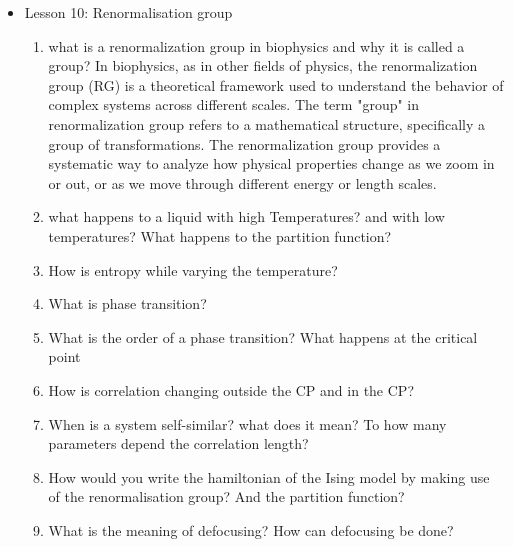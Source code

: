 {\begin{itemize}
\begin{enumerate}
        \item Obtain $P_0(v)$, which is the probability associated to a certain value of energy, which shape does it have?
        \item Supposing the Gaussian shape, what's the inequality that you obtain?? What is the gibbs Bogoliubov inequality?
        \item What does the calculation of the free energy difference allows you to do
        \item How can you simplify the calculation? make the example regarding the solvated ion
        \item What is a reaction coordinate
        \item Make the example taking the distance as collective coordinate
    \end{enumerate}
    \item Lesson 10: Renormalisation group
    \begin{enumerate}
        \item what is a renormalization group in biophysics and why it is called a group? 
        In biophysics, as in other fields of physics, the renormalization group (RG) is a theoretical framework used to understand the behavior of 
        complex systems across different scales. The term "group" in renormalization group refers to a mathematical structure, specifically a group of 
        transformations. The renormalization group provides a systematic way to analyze how physical properties change as we zoom in or out, or as we
         move through different energy or length scales.
        \item what happens to a liquid with high Temperatures? and with low temperatures? What happens to the partition function?
        \item How is entropy while varying the temperature?
        \item What is phase transition?
        \item What is the order of a phase transition? What happens at the critical point
        \item How is correlation changing outside the CP and in the CP?
        \item When is a system self-similar? what does it mean? To how many parameters depend the correlation length? 
        \item How would you write the hamiltonian of the Ising model by making use of the renormalisation group? And the partition function?
        \item What is the meaning of defocusing? How can defocusing be done?

\end{enumerate}
\end{itemize}}
